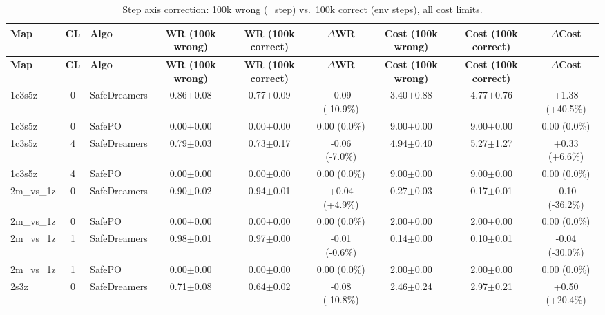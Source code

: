 \documentclass{article}
\begin{document}
\begin{longtable}{lclcccccc}
\caption{Step axis correction: 100k wrong (\_step) vs.\ 100k correct (env steps), all cost limits.} \\
\toprule
\textbf{Map} & \textbf{CL} & \textbf{Algo} & \textbf{WR (100k wrong)} & \textbf{WR (100k correct)} & \textbf{$\Delta$WR} & \textbf{Cost (100k wrong)} & \textbf{Cost (100k correct)} & \textbf{$\Delta$Cost} \\
\midrule
\endfirsthead
\toprule
\textbf{Map} & \textbf{CL} & \textbf{Algo} & \textbf{WR (100k wrong)} & \textbf{WR (100k correct)} & \textbf{$\Delta$WR} & \textbf{Cost (100k wrong)} & \textbf{Cost (100k correct)} & \textbf{$\Delta$Cost} \\
\midrule
\endhead
1c3s5z & 0 & SafeDreamers & 0.86$\pm$0.08 & 0.77$\pm$0.09 & \textcolor{red!55!black}{-0.09 (-10.9\%)} & 3.40$\pm$0.88 & 4.77$\pm$0.76 & \textcolor{red!85!black}{+1.38 (+40.5\%)} \\
1c3s5z & 0 & SafePO & 0.00$\pm$0.00 & 0.00$\pm$0.00 & \textcolor{red!40!black}{0.00 (0.0\%)} & 9.00$\pm$0.00 & 9.00$\pm$0.00 & \textcolor{green!40!black}{0.00 (0.0\%)} \\
1c3s5z & 4 & SafeDreamers & 0.79$\pm$0.03 & 0.73$\pm$0.17 & \textcolor{red!55!black}{-0.06 (-7.0\%)} & 4.94$\pm$0.40 & 5.27$\pm$1.27 & \textcolor{red!55!black}{+0.33 (+6.6\%)} \\
1c3s5z & 4 & SafePO & 0.00$\pm$0.00 & 0.00$\pm$0.00 & \textcolor{red!40!black}{0.00 (0.0\%)} & 9.00$\pm$0.00 & 9.00$\pm$0.00 & \textcolor{green!40!black}{0.00 (0.0\%)} \\
\midrule
2m\_vs\_1z & 0 & SafeDreamers & 0.90$\pm$0.02 & 0.94$\pm$0.01 & \textcolor{green!40!black}{+0.04 (+4.9\%)} & 0.27$\pm$0.03 & 0.17$\pm$0.01 & \textcolor{green!85!black}{-0.10 (-36.2\%)} \\
2m\_vs\_1z & 0 & SafePO & 0.00$\pm$0.00 & 0.00$\pm$0.00 & \textcolor{red!40!black}{0.00 (0.0\%)} & 2.00$\pm$0.00 & 2.00$\pm$0.00 & \textcolor{green!40!black}{0.00 (0.0\%)} \\
2m\_vs\_1z & 1 & SafeDreamers & 0.98$\pm$0.01 & 0.97$\pm$0.00 & \textcolor{red!40!black}{-0.01 (-0.6\%)} & 0.14$\pm$0.00 & 0.10$\pm$0.01 & \textcolor{green!70!black}{-0.04 (-30.0\%)} \\
2m\_vs\_1z & 1 & SafePO & 0.00$\pm$0.00 & 0.00$\pm$0.00 & \textcolor{red!40!black}{0.00 (0.0\%)} & 2.00$\pm$0.00 & 2.00$\pm$0.00 & \textcolor{green!40!black}{0.00 (0.0\%)} \\
\midrule
2s3z & 0 & SafeDreamers & 0.71$\pm$0.08 & 0.64$\pm$0.02 & \textcolor{red!55!black}{-0.08 (-10.8\%)} & 2.46$\pm$0.24 & 2.97$\pm$0.21 & \textcolor{red!70!black}{+0.50 (+20.4\%)} \\

\end{longtable}
\end{document}
